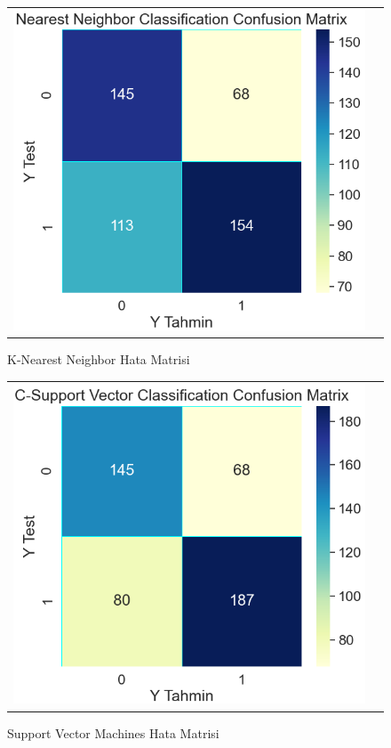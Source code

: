\documentclass[conference]{IEEEtran}
\begin{document}
\begin{figure}[!h]
	\centering
	\begin{center}
		\begin{tabular}{cc}
			\includegraphics[scale=0.39]{pictures/pic_10.png}&
		\end{tabular}
	\end{center}
	\caption{K-Nearest Neighbor Hata Matrisi}
	\label{fig:10}
\end{figure}
\newpage
\begin{figure}[!h]
	\centering
	\begin{center}
		\begin{tabular}{cc}
			\includegraphics[scale=0.4]{pictures/pic_11.png}&
		\end{tabular}
	\end{center}
	\caption{Support Vector Machines Hata Matrisi}
	\label{fig:11}
\end{figure}
\end{document}
